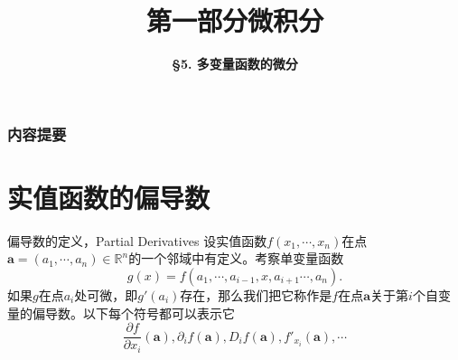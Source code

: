 




\title[Calculus]{\LARGE \bfseries 第一部分\quad 微积分} %
\author[Differential of Multivariate Functions] %
{\Large \bfseries \S 5. 多变量函数的微分
}
\date{}



\begin{frame}
\titlepage %
\end{frame}

\begin{frame}
\frametitle{内容提要} %
\tableofcontents %
\end{frame}


\section{实值函数的偏导数} %


\begin{frame}

\begin{block}{偏导数的定义，Partial Derivatives}
设实值函数$f(x_1,\cdots,x_n)$在点$\mathbf{a} = (a_1,\cdots,a_n) \in \mathbb{R}^n$的一个邻域中有定义。考察单变量函数
\[g(x) = f(a_1,\cdots,a_{i-1},x,a_{i+1}\cdots,a_n).\]
如果$g$在点$a_i$处可微，即$g'(a_i)$存在，那么我们把它称作是$f$在点$\mathbf{a}$关于第$i$个自变量的偏导数。以下每个符号都可以表示它
\[\dfrac{\partial f}{\partial x_i}(\mathbf{a}), \partial_i f(\mathbf{a}), D_i f(\mathbf{a}), f'_{x_i}(\mathbf{a}),\cdots\]
\end{block}

\end{frame}

